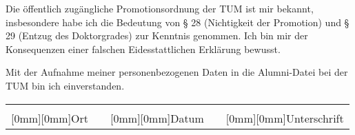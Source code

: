 Die öffentlich zugängliche Promotionsordnung der TUM ist mir bekannt, insbesondere habe ich die Bedeutung von § 28 (Nichtigkeit der Promotion) und § 29 (Entzug des Doktorgrades) zur Kenntnis genommen. Ich bin mir der Konsequenzen einer falschen Eidesstattlichen Erklärung bewusst.

Mit der Aufnahme meiner personenbezogenen Daten in die Alumni-Datei bei der TUM bin ich einverstanden.

{
\vspace{20mm}
\noindent
\setlength{\tabcolsep}{0cm}
\begin{tabular}{p{6cm}p{0.5cm}p{4cm}p{0.5cm}p{4cm}}
	\makebox[6cm]{\hrulefill} & & \makebox[4cm]{\hrulefill} & & \makebox[4cm]{\hrulefill} \\
	\raisebox{1ex}[0mm][0mm]{\footnotesize{Ort}} & & \raisebox{1ex}[0mm][0mm]{\footnotesize{Datum}} & & \raisebox{1ex}[0mm][0mm]{\footnotesize{Unterschrift}} \\
\end{tabular}
}

\clearpage
{}

